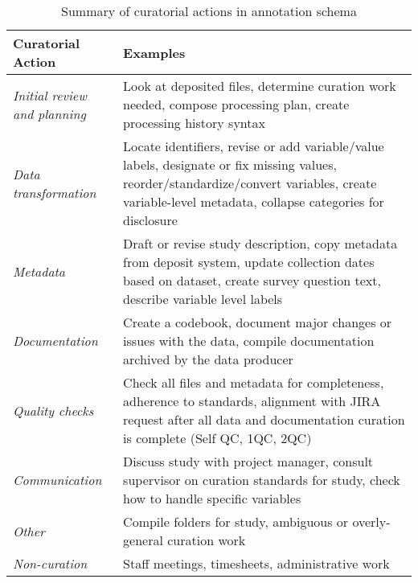 \documentclass[conference]{IEEEtran}
\begin{document}
\begin{table}[t]
\caption{Summary of curatorial actions in annotation schema}
\centering
\begin{tabularx}{\columnwidth}{|l|X|}
\hline
\textbf{Curatorial Action}           & \textbf{Examples}                                                                                                                                                             \\ 
\hline
\textit{Initial review and planning} & 
Look at deposited files, determine curation work needed, compose processing plan, create processing history syntax                                                                                              \\ 
\hline
\textit{Data transformation}         & Locate identifiers, revise or add variable/value labels, designate or fix missing values, reorder/standardize/convert variables, create variable-level metadata, collapse categories for disclosure                                             \\ 
\hline
\textit{Metadata}          & Draft or revise study description, copy metadata from deposit system, update collection dates based on dataset, create survey question text, describe variable level labels                                                      \\ 
\hline
\textit{Documentation}               & Create a codebook, document major changes or issues with the data, compile documentation archived by the data producer                                                        \\ 
\hline
\textit{Quality checks}              & Check all files and metadata for completeness, adherence to standards, alignment with JIRA request after all data and documentation curation is complete (Self QC, 1QC, 2QC)  \\ 
\hline
\textit{Communication}     & Discuss study with project manager, consult supervisor on curation standards for study, check how to handle specific variables                                                \\ 
\hline
\textit{Other}                       & Compile folders for study, ambiguous or overly-general curation work                                                                                                         \\ 
\hline
\textit{Non-curation}                & Staff meetings, timesheets, administrative work                                                                                                                               \\
\hline
\end{tabularx}
\label{table:definitions}
\end{table}
\end{document}
